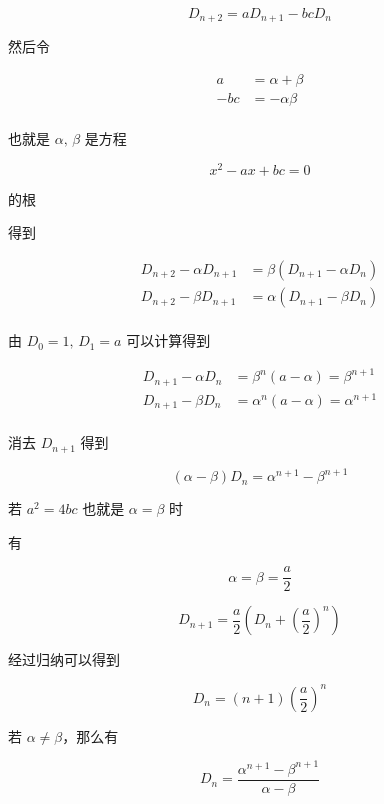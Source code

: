 \documentclass[12pt,a4paper]{ctexart}
\begin{document}
\[
D_{n+2} = aD_{n+1} - bcD_{n}
\]

然后令

\begin{align*}
a &= \alpha + \beta  \\
-bc &= -\alpha \beta  \\
\end{align*}

也就是 $\alpha,\, \beta$ 是方程

\[
x^2 - ax +bc = 0
\]

的根

得到

\begin{align*}
D_{n+2} - \alpha D_{n+1} &= \beta(D_{n+1} - \alpha D_{n} )  \\
D_{n+2} - \beta D_{n+1} &= \alpha (D_{n+1} - \beta D_{n} )  \\
\end{align*}

由 $D_0 = 1,\, D_1 = a$ 可以计算得到

\begin{align*}
D_{n+1}  - \alpha D_{n} &= \beta^{n}(a - \alpha) = \beta^{n+1} \\
D_{n+1}  - \beta D_{n} &= \alpha^{n}(a - \alpha) = \alpha^{n+1}\\
\end{align*}

消去 $D_{n+1}$ 得到

\[
(\alpha - \beta)D_n = \alpha^{n+1} - \beta^{n+1}
\]

若 $a^2 = 4bc$ 也就是 $\alpha = \beta$ 时

有

\[
\alpha = \beta = \frac{a}{2}
\]

\[
D_{n+1} = \frac{a}{2}(D_n + (\frac{a}{2})^{n})
\]

经过归纳可以得到

\[
D_n = (n+1)(\frac{a}{2})^n
\]

若 $\alpha \ne \beta$，那么有

\[
D_n = \frac{\alpha^{n+1}- \beta^{n+1}}{\alpha - \beta}
\]
\end{document}

